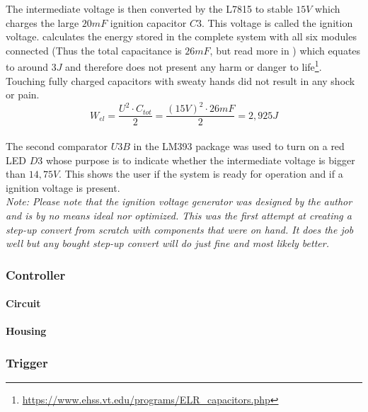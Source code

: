 \noindent The intermediate voltage is then converted by the L7815 to stable $15V$ which charges the large $20mF$ ignition capacitor $C3$.  This voltage is called the ignition voltage. calculates the energy stored in the complete system with all six modules connected (Thus the total capacitance is $26mF$, but read more in ) which equates to around $3J$ and therefore does not present any harm or danger to life\footnote{\url{https://www.ehss.vt.edu/programs/ELR_capacitors.php}}. Touching fully charged capacitors with sweaty hands did not result in any shock or pain.\\

\begin{equation}
W_{el}=\frac{U^2 \cdot C_{tot}}{2}=\frac{(15V)^2 \cdot 26mF}{2}=2,925J
\label{eq:power_in_system}
\end{equation}\\

\noindent The second comparator $U3B$ in the LM393 package was used to turn on a red LED $D3$ whose purpose is to indicate whether the intermediate voltage is bigger than $14,75V$. This shows the user if the system is ready for operation and if a ignition voltage is present.\\


\noindent \small{\textit{Note: Please note that the ignition voltage generator was designed by the author and is by no means ideal nor optimized. This was the first attempt at creating a step-up convert from scratch with components that were on hand. It does the job well but any bought step-up convert will do just fine and most likely better.}}\\

\pagebreak

\subsubsection{Controller}
\label{Controller}
\paragraph{Circuit}
\paragraph{Housing}

\subsubsection{Trigger}
